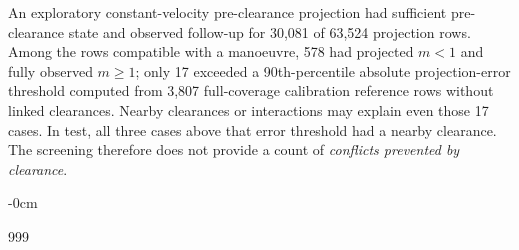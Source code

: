 \documentclass[aerospace,article,submit,moreauthors]{Definitions/mdpi}
\begin{document}
An exploratory constant-velocity pre-clearance projection had sufficient pre-clearance state and observed follow-up for 30,081 of 63,524 projection rows. Among the rows compatible with a manoeuvre, 578 had projected $m<1$ and fully observed $m\ge1$; only 17 exceeded a 90th-percentile absolute projection-error threshold computed from 3,807 full-coverage calibration reference rows without linked clearances. Nearby clearances or interactions may explain even those 17 cases. In test, all three cases above that error threshold had a nearby clearance. The screening therefore does not provide a count of \emph{conflicts prevented by clearance}.




\begin{adjustwidth}{-\extralength}{0cm}



% 


\begin{thebibliography}{999}


\end{thebibliography}
\end{adjustwidth}
\end{document}
